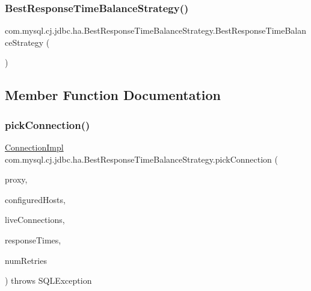 \subsubsection{\texorpdfstring{Best\+Response\+Time\+Balance\+Strategy()}{BestResponseTimeBalanceStrategy()}}
{\footnotesize\ttfamily com.\+mysql.\+cj.\+jdbc.\+ha.\+Best\+Response\+Time\+Balance\+Strategy.\+Best\+Response\+Time\+Balance\+Strategy (\begin{DoxyParamCaption}{ }\end{DoxyParamCaption})}



\subsection{Member Function Documentation}
\mbox{\label{classcom_1_1mysql_1_1cj_1_1jdbc_1_1ha_1_1_best_response_time_balance_strategy_a74a8dcc0f838d2df9ff727db02bfe628}} 
\subsubsection{\texorpdfstring{pick\+Connection()}{pickConnection()}}
{\footnotesize\ttfamily \mbox{\hyperlink{classcom_1_1mysql_1_1cj_1_1jdbc_1_1_connection_impl}{Connection\+Impl}} com.\+mysql.\+cj.\+jdbc.\+ha.\+Best\+Response\+Time\+Balance\+Strategy.\+pick\+Connection (\begin{DoxyParamCaption}\item[{Invocation\+Handler}]{proxy,  }\item[{List$<$ String $>$}]{configured\+Hosts,  }\item[{Map$<$ String, \mbox{\hyperlink{interfacecom_1_1mysql_1_1cj_1_1jdbc_1_1_jdbc_connection}{Jdbc\+Connection}} $>$}]{live\+Connections,  }\item[{long \mbox{[}$\,$\mbox{]}}]{response\+Times,  }\item[{int}]{num\+Retries }\end{DoxyParamCaption}) throws S\+Q\+L\+Exception}


